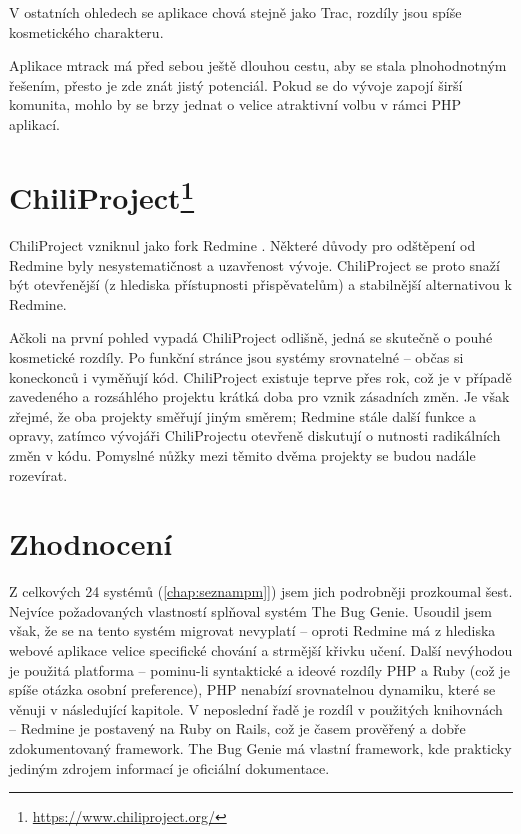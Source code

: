 \documentclass[thesis=B,czech]{FITthesis}[2012/05/02]
\begin{document}
V ostatních ohledech se aplikace chová stejně jako Trac, rozdíly jsou
spíše kosmetického charakteru.

Aplikace mtrack má před sebou ještě dlouhou cestu, aby se stala plnohodnotným
řešením, přesto je zde znát jistý potenciál. Pokud se do vývoje zapojí
širší komunita, mohlo by se brzy jednat o velice atraktivní volbu v
rámci PHP aplikací.

\section[ChiliProject]{ChiliProject\footnote{\url{https://www.chiliproject.org/}}}

ChiliProject vzniknul jako \gls{fork} Redmine
\citep{ChiliProjectWhyFork}. Některé důvody pro odštěpení od Redmine
byly nesystematičnost a uzavřenost vývoje. ChiliProject se proto snaží
být otevřenější (z hlediska přístupnosti přispěvatelům) a stabilnější
alternativou k Redmine.

Ačkoli na první pohled vypadá ChiliProject odlišně, jedná se skutečně
o pouhé kosmetické rozdíly. Po funkční stránce jsou systémy srovnatelné -- občas
si koneckonců i vyměňují kód. ChiliProject existuje teprve přes
rok, což je v případě zavedeného a rozsáhlého projektu krátká doba pro
vznik zásadních změn. Je však zřejmé, že oba projekty směřují jiným
směrem; Redmine stále  další funkce a opravy, zatímco
vývojáři ChiliProjectu otevřeně diskutují o nutnosti radikálních změn
v kódu. Pomyslné nůžky mezi těmito dvěma projekty se budou nadále
rozevírat.

\section{Zhodnocení}

Z celkových 24 systémů (\autoref{chap:seznampm}]) jsem jich podrobněji
prozkoumal šest. Nejvíce požadovaných vlastností splňoval systém The Bug
Genie. Usoudil jsem však, že se na tento systém migrovat nevyplatí --
oproti Redmine má z hlediska webové aplikace velice specifické chování a
strmější křivku učení. Další nevýhodou je použitá platforma -- pominu-li
syntaktické a ideové rozdíly PHP a Ruby (což je spíše otázka osobní
preference), PHP nenabízí srovnatelnou dynamiku, které se věnuji
v následující kapitole. V neposlední řadě je
rozdíl v použitých knihovnách -- Redmine je postavený na Ruby on Rails,
což je časem prověřený a dobře zdokumentovaný framework. The Bug Genie
má vlastní framework, kde prakticky jediným zdrojem informací je
oficiální dokumentace.
\end{document}
